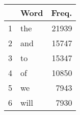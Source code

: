 \begin{tabular}{rlr}
  \toprule
 & Word & Freq. \\ 
  \midrule
1 & the & 21939 \\ 
  2 & and & 15747 \\ 
  3 & to & 15347 \\ 
  4 & of & 10850 \\ 
  5 & we & 7943 \\ 
  6 & will & 7930 \\ 
   \bottomrule
\end{tabular}
